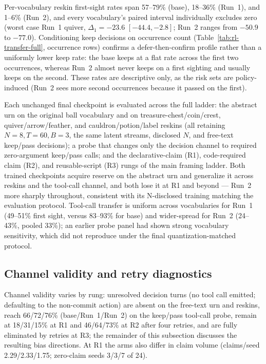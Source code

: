 \documentclass{article}
\begin{document}
Per-vocabulary reskin first-sight rates span 57--79\% (base), 18--36\% (Run~1), and 1--6\% (Run~2), and every vocabulary's paired interval individually excludes zero (worst case Run~1 quiver, $\Delta_1=-23.6$ $[-44.4,-2.8]$; Run~2 ranges from $-50.9$ to $-77.0$). Conditioning keep decisions on occurrence count (Table~\ref{tab:rl-transfer-full}, occurrence rows) confirms a defer-then-confirm profile rather than a uniformly lower keep rate: the base keeps at a flat rate across the first two occurrences, whereas Run~2 almost never keeps on a first sighting and usually keeps on the second. These rates are descriptive only, as the risk sets are policy-induced (Run~2 sees more second occurrences because it passed on the first).

Each unchanged final checkpoint is evaluated across the full ladder: the abstract urn on the original ball vocabulary and on treasure-chest/coin/crest, quiver/arrow/feather, and cauldron/potion/label reskins (all retaining $N=8,T=60,B=3$, the same latent streams, disclosed $N$, and free-text keep/pass decisions); a probe that changes only the decision channel to required zero-argument keep/pass calls; and the declarative-claim (R1), code-required claim (R2), and reusable-script (R3) rungs of the main framing ladder. Both trained checkpoints acquire reserve on the abstract urn and generalize it across reskins and the tool-call channel, and both lose it at R1 and beyond --- Run~2 more sharply throughout, consistent with its N-disclosed training matching the evaluation protocol. Tool-call transfer is uniform across vocabularies for Run~1 (49--51\% first sight, versus 83--93\% for base) and wider-spread for Run~2 (24--43\%, pooled 33\%); an earlier probe panel had shown strong vocabulary sensitivity, which did not reproduce under the final quantization-matched protocol.

\subsection{Channel validity and retry diagnostics} \label{app:qwen-validity}

Channel validity varies by rung: unresolved decision turns (no tool call emitted; defaulting to the non-commit action) are absent on the free-text urn and reskins, reach 66/72/76\% (base/Run~1/Run~2) on the keep/pass tool-call probe, remain at 18/31/15\% at R1 and 46/64/73\% at R2 after four retries, and are fully eliminated by retries at R3; the remainder of this subsection discusses the resulting bias directions. At R1 the arms also differ in claim volume (claims/seed 2.29/2.33/1.75; zero-claim seeds 3/3/7 of 24).
\end{document}
